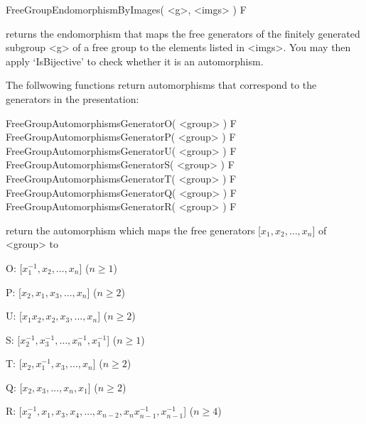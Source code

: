 \>FreeGroupEndomorphismByImages( <g>, <imgs> ) F

returns the endomorphism that maps the free generators of the finitely
generated subgroup <g> of a free group to the elements listed in <imgs>.
You may then apply `IsBijective' to check whether it is an
automorphism.

The follwowing functions return automorphisms that correspond to the
generators in the presentation:

\>FreeGroupAutomorphismsGeneratorO( <group> ) F
\>FreeGroupAutomorphismsGeneratorP( <group> ) F
\>FreeGroupAutomorphismsGeneratorU( <group> ) F
\>FreeGroupAutomorphismsGeneratorS( <group> ) F
\>FreeGroupAutomorphismsGeneratorT( <group> ) F
\>FreeGroupAutomorphismsGeneratorQ( <group> ) F
\>FreeGroupAutomorphismsGeneratorR( <group> ) F

return the automorphism which maps the free generators 
[$ x_1, x_2, \dots, x_n $] of <group> to
\beginlist
  \item{O:} [$ x_1^{-1}, x_2, \dots, x_n $]                      ($n\ge1$)
  \item{P:} [$ x_2, x_1, x_3, \dots, x_n $]                      ($n\ge2$)
  \item{U:} [$ x_1x_2, x_2, x_3, \dots, x_n $]                   ($n\ge2$)
  \item{S:} [$ x_2^{-1}, x_3^{-1}, \dots, x_n^{-1}, x_1^{-1} $]  ($n\ge1$)
  \item{T:} [$ x_2, x_1^{-1}, x_3, \dots, x_n $]                 ($n\ge2$)
  \item{Q:} [$ x_2, x_3, \dots, x_n, x_1 $]                      ($n\ge2$)
  \item{R:} [$ x_2^{-1}, x_1, x_3, x_4, \dots,
             x_{n-2}, x_nx_{n-1}^{-1}, x_{n-1}^{-1} $]           ($n\ge4$)
\endlist



